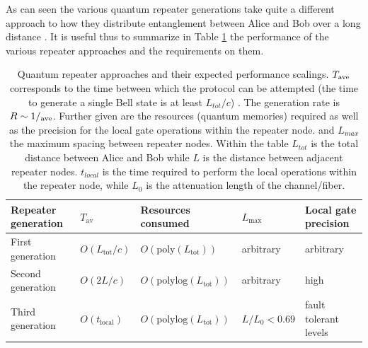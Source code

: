 \documentclass[twocolumn, aps, rmp, amsmath, amssymb, nofootinbib, superscriptaddress, longbibliography, floatfix, table-of-contents, eqsecnum]{revtex4-1}
\begin{document}
As can seen the various quantum repeater generations take quite a different approach to how they distribute entanglement between Alice and Bob over a long distance \cite{Muralidharan2016}. It is useful thus to  summarize in Table \ref{qtable} the performance of the various repeater approaches and the requirements on them.
\begin{widetext}
\begin{center}
\begin{table}[!htb]
\centering
\begin{tabular}{ccccc}
\hline
\multicolumn{1}{|l|}{\textbf{Repeater generation}} & \multicolumn{1}{l|}{\rm $T_\mathrm{av}$}   & \multicolumn{1}{l|}{\rm Resources consumed}    & \multicolumn{1}{l|}{\rm  $L_\mathrm{max}$}     & \multicolumn{1}{l|}{\rm  Local gate precision}     \\ \hline \hline
\multicolumn{1}{|l|}{First generation}    & \multicolumn{1}{l|}{$O(L_\mathrm{tot}/c)$} & \multicolumn{1}{l|}{$O(\mathrm{poly}(L_\mathrm{tot}))$} & \multicolumn{1}{l|}{\rm arbitrary}  & \multicolumn{1}{l|}{\rm arbitrary}    \\ \hline
\multicolumn{1}{|l|}{Second generation}   & \multicolumn{1}{l|}{$O(2 L/c)$}     & \multicolumn{1}{l|}{$O(\mathrm{polylog}(L_\mathrm{tot}))$} & \multicolumn{1}{l|}{\rm arbitrary}  & \multicolumn{1}{l|}{\rm high}   \\ \hline
\multicolumn{1}{|l|}{Third generation}   & \multicolumn{1}{l|}{$O(t_\mathrm{local})$}     & \multicolumn{1}{l|}{$O(\mathrm{polylog}(L_\mathrm{tot}))$} & \multicolumn{1}{l|}{$L/L_0<0.69$}   & \multicolumn{1}{l|}{\rm fault tolerant levels}   \\
\hline
\end{tabular}
\caption{Quantum repeater approaches and their expected performance scalings.  $T_{\rm ave}$ corresponds to the time between which the protocol can be attempted (the time to generate a single Bell state is at least $L_{tot}/c$) \cite{Muralidharan2016}. The generation rate is $R\sim 1/ _{\rm ave}$. Further given are the resources (quantum memories) required as well as the precision for the local gate operations within the repeater node. and $L_{max}$ the maximum spacing between repeater nodes. Within the table  $L_{tot}$ is the total distance between Alice and Bob while $L$ is the distance between adjacent repeater nodes. $t_{local}$ is the time required to perform the local operations within the repeater node, while $L_0$ is the attenuation length of the channel/fiber.}
\label{qtable}
\end{table}
\end{center}
\end{widetext}
\end{document}

